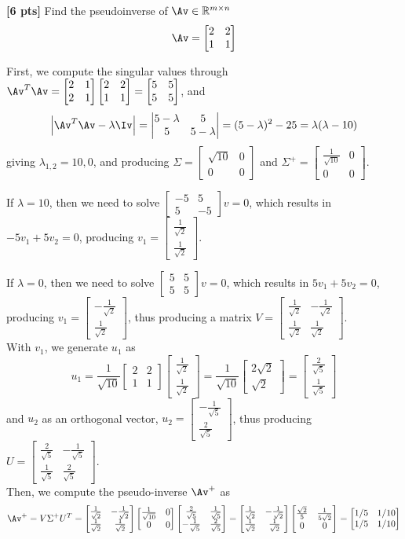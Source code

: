 \documentclass[11pt,addpoints,answers]{exam}
\numberwithin{equation}{section} %
\numberwithin{figure}{section} %
\numberwithin{table}{section} %
\newcommand{\twodet}[4]{\left|\begin{matrix} #1 & #2 \\ #3 & #4 \end{matrix}\right|}
\newcommand{\twomat}[4]{\begin{bmatrix} #1 & #2 \\ #3 & #4 \end{bmatrix}}
\newcommand{\twovec}[2]{\begin{bmatrix} #1 \\ #2 \end{bmatrix}}
\begin{document}
\begin{questions}
    \question \textbf{[6 pts]}  Find the pseudoinverse of $\Av \in \mathbb{R}^{m \times n}$
    \begin{align*}
        \Av = \begin{bmatrix}
            2 & 2 \\ 1 & 1
        \end{bmatrix}
    \end{align*}
    \begin{tcolorbox}[fit,height=12cm, width=\textwidth, blank, borderline={0.5pt}{-2pt}, valign=center, nobeforeafter]
        First, we compute the singular values through $\Av^T\Av = \twomat{2}{1}{2}{1}\twomat{2}{2}{1}{1} = \twomat{5}{5}{5}{5}$, and
        $$
            \left| \Av^T\Av - \lambda\Iv \right| = \twodet{5 - \lambda}{5}{5}{5 - \lambda} = (5 - \lambda)^2 - 25 = \lambda(\lambda - 10)
        $$
        giving $\lambda_{1, 2} = 10, 0$, and producing $\Sigma = \twomat{\sqrt{10}}{0}{0}{0}$ and $\Sigma^+ = \twomat{\frac{1}{\sqrt{10}}}{0}{0}{0}$.

        If $\lambda = 10$, then we need to solve $\twomat{-5}{5}{5}{-5}v = 0$, which results in $-5v_1+5v_2 = 0$, producing $v_1 = \twovec{\frac{1}{\sqrt{2}}}{\frac{1}{\sqrt{2}}}$.

        If $\lambda = 0$, then we need to solve $\twomat{5}{5}{5}{5}v = 0$, which results in $5v_1+5v_2 = 0$, producing $v_1 = \twovec{-\frac{1}{\sqrt{2}}}{\frac{1}{\sqrt{2}}}$, thus producing a matrix $V = \twomat{\frac{1}{\sqrt{2}}}{-\frac{1}{\sqrt{2}}}{\frac{1}{\sqrt{2}}}{\frac{1}{\sqrt{2}}}$.\\

        With $v_1$, we generate $u_1$ as
        $$
            u_1 = \frac{1}{\sqrt{10}}\twomat{2}{2}{1}{1}\twovec{\frac{1}{\sqrt{2}}}{\frac{1}{\sqrt{2}}}
                = \frac{1}{\sqrt{10}}\twovec{2\sqrt{2}}{\sqrt{2}}
                = \twovec{\frac{2}{\sqrt{5}}}{\frac{1}{\sqrt{5}}}
        $$
        and $u_2$ as an orthogonal vector, $u_2 = \twovec{-\frac{1}{\sqrt{5}}}{\frac{2}{\sqrt{5}}}$, thus producing $U = \twomat{\frac{2}{\sqrt{5}}}{-\frac{1}{\sqrt{5}}}{\frac{1}{\sqrt{5}}}{\frac{2}{\sqrt{5}}}$.\\

        Then, we compute the pseudo-inverse $\Av^+$ as
        $$
            \Av^+ = V\Sigma^+U^T
                = \twomat{\frac{1}{\sqrt{2}}}{-\frac{1}{\sqrt{2}}}{\frac{1}{\sqrt{2}}}{\frac{1}{\sqrt{2}}}
                    \twomat{\frac{1}{\sqrt{10}}}{0}{0}{0}
                    \twomat{\frac{2}{\sqrt{5}}}{\frac{1}{\sqrt{5}}}{-\frac{1}{\sqrt{5}}}{\frac{2}{\sqrt{5}}}
                = \twomat{\frac{1}{\sqrt{2}}}{-\frac{1}{\sqrt{2}}}{\frac{1}{\sqrt{2}}}{\frac{1}{\sqrt{2}}}
                    \twomat{\frac{\sqrt{2}}{5}}{\frac{1}{5\sqrt{2}}}{0}{0}
                = \twomat{1/5}{1/10}{1/5}{1/10}
        $$
    \end{tcolorbox}


\end{questions}
\end{document}
